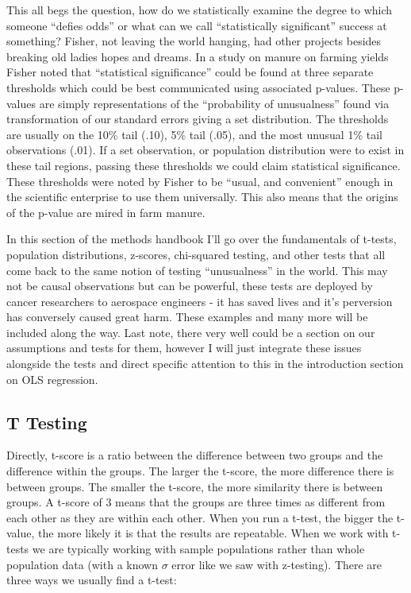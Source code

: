 \documentclass[12pt]{article}\usepackage[]{graphicx}\usepackage[]{color}
\begin{document}
\begin{flushleft}
This all begs the question, how do we statistically examine the degree to which someone ``defies odds'' or what can we call ``statistically significant'' success at something? Fisher, not leaving the world hanging, had other projects besides breaking old ladies hopes and dreams. In a study on manure on farming yields Fisher noted that ``statistical significance'' could be found at three separate thresholds which could be best communicated using associated p-values. These p-values are simply representations of the ``probability of unusualness'' found via transformation of our standard errors giving a set distribution. The thresholds are usually on the 10\% tail (.10), 5\% tail (.05), and the most unusual 1\% tail observations (.01). If a set observation, or population distribution were to exist in these tail regions, passing these thresholds we could claim statistical significance. These thresholds were noted by Fisher to be ``usual, and convenient'' enough in the scientific enterprise to use them universally. This also means that the origins of the p-value are mired in farm manure.

In this section of the methods handbook I'll go over the fundamentals of t-tests, population distributions, z-scores, chi-squared testing, and other tests that all come back to the same notion of testing ``unusualness'' in the world. This may not be causal observations but can be powerful, these tests are deployed by cancer researchers to aerospace engineers - it has saved lives and it's perversion has conversely caused great harm. These examples and many more will be included along the way. Last note, there very well could be a section on our assumptions and tests for them, however I will just integrate these issues alongside the tests and direct specific attention to this in the introduction section on OLS regression.

\subsection{T Testing}

Directly, t-score is a ratio between the difference between two groups and the difference within the groups. The larger the t-score, the more difference there is between groups. The smaller the t-score, the more similarity there is between groups. A t-score of 3 means that the groups are three times as different from each other as they are within each other. When you run a t-test, the bigger the t-value, the more likely it is that the results are repeatable. When we work with t-tests we are typically working with sample populations rather than whole population data (with a known $\sigma$ error like we saw with z-testing). There are three ways we usually find a t-test:


\end{flushleft}
\end{document}
